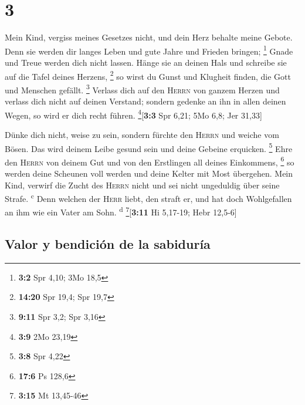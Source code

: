 \hypertarget{section-2}{%
\section{3}\label{section-2}}

 Mein Kind, vergiss meines Gesetzes nicht, und dein Herz
behalte meine Gebote.  Denn sie werden dir langes Leben
und gute Jahre und Frieden bringen; \footnote{\textbf{3:2} Spr 4,10; 3Mo
  18,5}  Gnade und Treue werden dich nicht lassen. Hänge
sie an deinen Hals und schreibe sie auf die Tafel deines Herzens,
\footnote{\textbf{14:20} Spr 19,4; Spr 19,7}  so wirst du
Gunst und Klugheit finden, die Gott und Menschen gefällt. \footnote{\textbf{9:11}
  Spr 3,2; Spr 3,16}  Verlass dich auf den \textsc{Herrn}
von ganzem Herzen und verlass dich nicht auf deinen Verstand;
 sondern gedenke an ihn in allen deinen Wegen, so wird er
dich recht führen. \footnote{\textbf{3:9} 2Mo 23,19}{[}\textbf{3:3} Spr
6,21; 5Mo 6,8; Jer 31,33{]}

 Dünke dich nicht, weise zu sein, sondern fürchte den
\textsc{Herrn} und weiche vom Bösen.  Das wird deinem
Leibe gesund sein und deine Gebeine erquicken. \footnote{\textbf{3:8}
  Spr 4,22}  Ehre den \textsc{Herrn} von deinem Gut und
von den Erstlingen all deines Einkommens, \footnote{\textbf{17:6} Ps
  128,6}  so werden deine Scheunen voll werden und deine
Kelter mit Most übergehen.  Mein Kind, verwirf die Zucht
des \textsc{Herrn} nicht und sei nicht ungeduldig über seine Strafe.
\textsuperscript{c}  Denn welchen der \textsc{Herr}
liebt, den straft er, und hat doch Wohlgefallen an ihm wie ein Vater am
Sohn. \textsuperscript{d} \footnote{\textbf{3:15} Mt 13,45-46}{[}\textbf{3:11}
Hi 5,17-19; Hebr 12,5-6{]}

\hypertarget{valor-y-bendiciuxf3n-de-la-sabiduruxeda}{%
\subsection{Valor y bendición de la
sabiduría}\label{valor-y-bendiciuxf3n-de-la-sabiduruxeda}}

